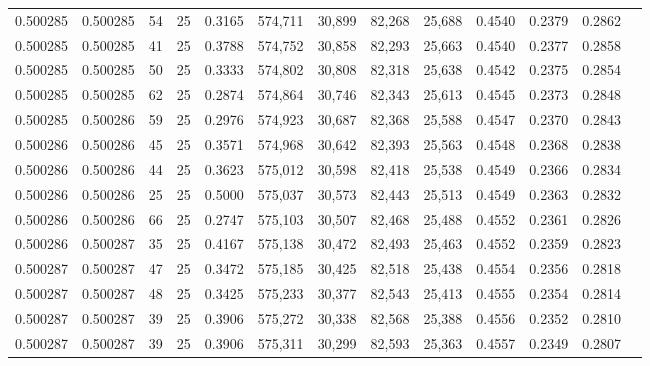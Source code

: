 \begin{tabular}{rrrrrrrrrrrrr}
0.500285 & 0.500285 &    54 &  25 &                                     0.3165 & 574,711 &  30,899 &  82,268 &  25,688 & 0.4540 & 0.2379 & 0.2862 \\
0.500285 & 0.500285 &    41 &  25 &                                     0.3788 & 574,752 &  30,858 &  82,293 &  25,663 & 0.4540 & 0.2377 & 0.2858 \\
0.500285 & 0.500285 &    50 &  25 &                                     0.3333 & 574,802 &  30,808 &  82,318 &  25,638 & 0.4542 & 0.2375 & 0.2854 \\
0.500285 & 0.500285 &    62 &  25 &                                     0.2874 & 574,864 &  30,746 &  82,343 &  25,613 & 0.4545 & 0.2373 & 0.2848 \\
0.500285 & 0.500286 &    59 &  25 &                                     0.2976 & 574,923 &  30,687 &  82,368 &  25,588 & 0.4547 & 0.2370 & 0.2843 \\
0.500286 & 0.500286 &    45 &  25 &                                     0.3571 & 574,968 &  30,642 &  82,393 &  25,563 & 0.4548 & 0.2368 & 0.2838 \\
0.500286 & 0.500286 &    44 &  25 &                                     0.3623 & 575,012 &  30,598 &  82,418 &  25,538 & 0.4549 & 0.2366 & 0.2834 \\
0.500286 & 0.500286 &    25 &  25 &                                     0.5000 & 575,037 &  30,573 &  82,443 &  25,513 & 0.4549 & 0.2363 & 0.2832 \\
0.500286 & 0.500286 &    66 &  25 &                                     0.2747 & 575,103 &  30,507 &  82,468 &  25,488 & 0.4552 & 0.2361 & 0.2826 \\
0.500286 & 0.500287 &    35 &  25 &                                     0.4167 & 575,138 &  30,472 &  82,493 &  25,463 & 0.4552 & 0.2359 & 0.2823 \\
0.500287 & 0.500287 &    47 &  25 &                                     0.3472 & 575,185 &  30,425 &  82,518 &  25,438 & 0.4554 & 0.2356 & 0.2818 \\
0.500287 & 0.500287 &    48 &  25 &                                     0.3425 & 575,233 &  30,377 &  82,543 &  25,413 & 0.4555 & 0.2354 & 0.2814 \\
0.500287 & 0.500287 &    39 &  25 &                                     0.3906 & 575,272 &  30,338 &  82,568 &  25,388 & 0.4556 & 0.2352 & 0.2810 \\
0.500287 & 0.500287 &    39 &  25 &                                     0.3906 & 575,311 &  30,299 &  82,593 &  25,363 & 0.4557 & 0.2349 & 0.2807 \\

\end{tabular}
